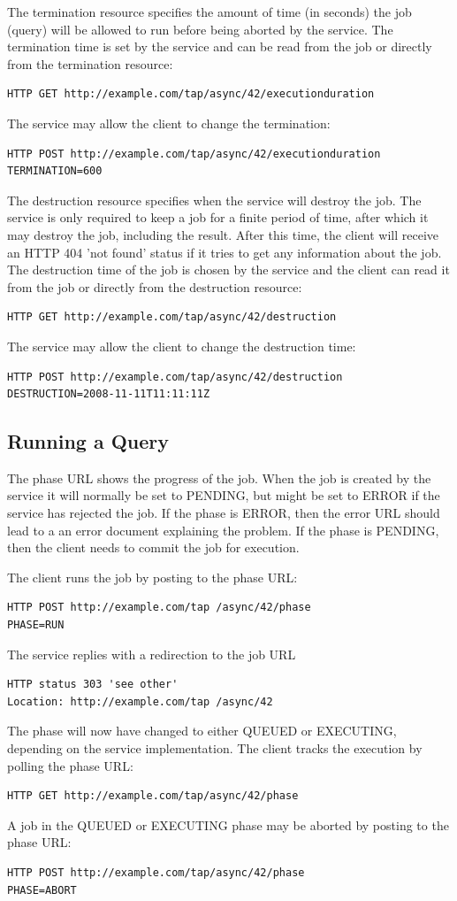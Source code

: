 \documentclass[11pt,a4paper]{ivoa}
\begin{document}
The termination resource specifies the amount of time (in seconds) the job 
(query) will be allowed to run before being aborted by the service. The 
termination time is set by the service and can be read from the job or directly 
from the termination resource:

\begin{verbatim}
HTTP GET http://example.com/tap/async/42/executionduration
\end{verbatim}
The service may allow the client to change the termination:
\begin{verbatim}
HTTP POST http://example.com/tap/async/42/executionduration
TERMINATION=600
\end{verbatim}
The destruction resource specifies when the service will destroy the job. The 
service is only required to keep a job for a finite period of time, after which 
it may destroy the job, including the result. After this time, the client will 
receive an HTTP 404 'not found' status if it tries to get any information about 
the job. The destruction time of the job is chosen by the service and the client 
can read it from the job or directly from the destruction resource:
\begin{verbatim}
HTTP GET http://example.com/tap/async/42/destruction
\end{verbatim}
The service may allow the client to change the destruction time:
\begin{verbatim}
HTTP POST http://example.com/tap/async/42/destruction
DESTRUCTION=2008-11-11T11:11:11Z
\end{verbatim}

\subsection{Running a Query}
The phase URL shows the progress of the job. When the job is created by the 
service it will normally be set to PENDING, but might be set to ERROR if the 
service has rejected the job. If the phase is ERROR, then the error URL should 
lead to a an error document explaining the problem. If the phase is PENDING, 
then the client needs to commit the job for execution.

The client runs the job by posting to the phase URL:
\begin{verbatim}
HTTP POST http://example.com/tap /async/42/phase
PHASE=RUN
\end{verbatim}

The service replies with a redirection to the job URL
\begin{verbatim}
HTTP status 303 'see other'
Location: http://example.com/tap /async/42
\end{verbatim}
The phase will now have changed to either QUEUED or EXECUTING, depending on the 
service implementation. The client tracks the execution by polling the phase 
URL:
\begin{verbatim}
HTTP GET http://example.com/tap/async/42/phase
\end{verbatim}
A job in the  QUEUED or EXECUTING phase may be aborted by posting to the phase 
URL:
\begin{verbatim}
HTTP POST http://example.com/tap/async/42/phase
PHASE=ABORT
\end{verbatim}
\end{document}
